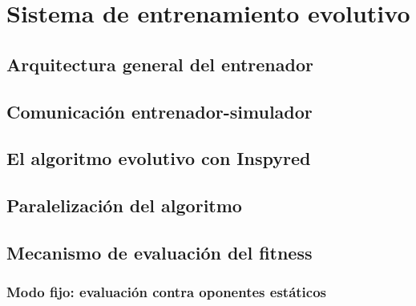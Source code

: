 \chapter{Sistema de entrenamiento evolutivo} \label{chap:entrenador}


\section{Arquitectura general del entrenador} \label{sec:arquitectura_entrenador}


\section{Comunicación entrenador-simulador} \label{sec:comunicacion_entrenador_simulador}


\section{El algoritmo evolutivo con Inspyred} \label{sec:algoritmo_evolutivo_inspyred}


\section{Paralelización del algoritmo} \label{sec:paralelizacion_algoritmo}


\section{Mecanismo de evaluación del fitness} \label{sec:mecanismos_evaluacion_fitness}

\subsection{Modo fijo: evaluación contra oponentes estáticos} \label{sec:modo_fijo_evaluacion}


